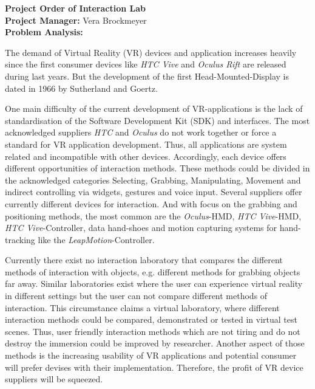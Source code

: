\documentclass[a4paper, 12pt]{article}
\newcommand{\changefont}[3]{
\fontfamily{#1} \fontseries{#2} \fontshape{#3} \selectfont}
\begin{document}


\newpage


\textbf{\Large Project Order of Interaction Lab}\\


\textbf{Project Manager:} Vera Brockmeyer\\


\textbf{Problem Analysis:}

The demand of Virtual Reality (VR) devices and application increases heavily since the first consumer devices like \textit{HTC Vive} and \textit{Oculus Rift} are released during last years. But the development of the first Head-Mounted-Display is dated in 1966 by Sutherland and Goertz. 

One main difficulty of the current development of VR-applications is the lack of standardisation of the Software Development Kit (SDK) and interfaces. The most acknowledged suppliers \textit{HTC} and \textit{Oculus} do not work together or force a standard for VR application development. Thus, all applications are system related and incompatible with other devices. Accordingly, each device offers different opportunities of interaction methods. These methods could be divided in the acknowledged categories Selecting, Grabbing, Manipulating, Movement and indirect controlling via widgets, gestures and voice input. Several suppliers offer currently different devices for interaction. And with focus on the grabbing and positioning methods, the most common are the \textit{Oculus}-HMD, \textit{HTC Vive}-HMD, \textit{HTC Vive}-Controller, data hand-shoes and motion capturing systems for hand-tracking like the \textit{LeapMotion}-Controller.

Currently there exist no interaction laboratory that compares the different methods of interaction with objects, e.g. different methods for grabbing objects far away. Similar laboratories \cite{lin2016towards}\cite{website:TU}\cite{website:steam} exist where the user can experience virtual reality in different settings but the user can not compare different methods of interaction. This circumstance claims a virtual laboratory, where different interaction methods could be compared, demonstrated or tested in virtual test scenes. Thus, user friendly interaction methods which are not tiring and do not destroy the immersion could be improved by researcher. Another aspect of those methods is the increasing usability of VR applications and potential consumer will prefer devises with their implementation. Therefore, the profit of VR device suppliers will be squeezed. \\
\end{document}
